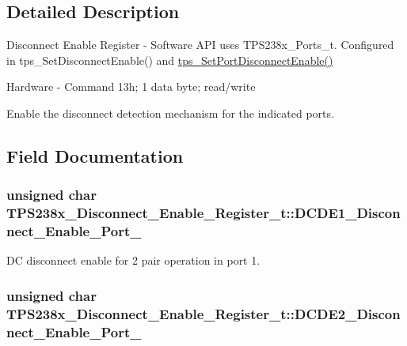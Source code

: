 \subsection{Detailed Description}
Disconnect Enable Register -\/ Software A\-P\-I uses T\-P\-S238x\-\_\-\-Ports\-\_\-t. Configured in tps\-\_\-\-Set\-Disconnect\-Enable() and \hyperlink{_t_p_s23861_8c_a7d110496e25b21006c33874d7930528d}{tps\-\_\-\-Set\-Port\-Disconnect\-Enable()} \par
 Hardware -\/ Command 13h; 1 data byte; read/write \par
\par
 Enable the disconnect detection mechanism for the indicated ports. 

\subsection{Field Documentation}
\hypertarget{struct_t_p_s238x___disconnect___enable___register__t_a16b9997a3f0d84cb9ab5e38f6a3e8cc6}{
\subsubsection[{D\-C\-D\-E1\-\_\-\-Disconnect\-\_\-\-Enable\-\_\-\-Port\-\_\-1}]{\setlength{\rightskip}{0pt plus 5cm}unsigned char T\-P\-S238x\-\_\-\-Disconnect\-\_\-\-Enable\-\_\-\-Register\-\_\-t\-::\-D\-C\-D\-E1\-\_\-\-Disconnect\-\_\-\-Enable\-\_\-\-Port\-\_}}\label{struct_t_p_s238x___disconnect___enable___register__t_a16b9997a3f0d84cb9ab5e38f6a3e8cc6}


D\-C disconnect enable for 2 pair operation in port 1. 

\hypertarget{struct_t_p_s238x___disconnect___enable___register__t_ac7be429693392634b0c9da86d4683dd9}{
\subsubsection[{D\-C\-D\-E2\-\_\-\-Disconnect\-\_\-\-Enable\-\_\-\-Port\-\_\-2}]{\setlength{\rightskip}{0pt plus 5cm}unsigned char T\-P\-S238x\-\_\-\-Disconnect\-\_\-\-Enable\-\_\-\-Register\-\_\-t\-::\-D\-C\-D\-E2\-\_\-\-Disconnect\-\_\-\-Enable\-\_\-\-Port\-\_}}\label{struct_t_p_s238x___disconnect___enable___register__t_ac7be429693392634b0c9da86d4683dd9}


